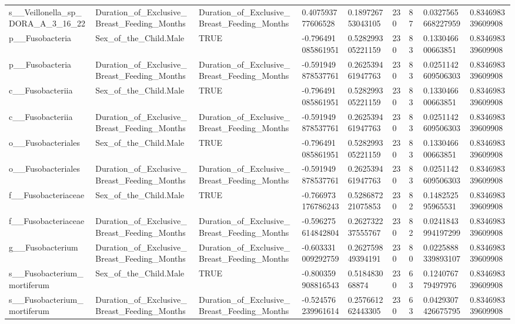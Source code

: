 \begin{longtable}{lllllllll}
s\_\_Veillonella\_sp\_DORA\_A\_3\_16\_22 & Duration\_of\_Exclusive\_Breast\_Feeding\_Months & Duration\_of\_Exclusive\_Breast\_Feeding\_Months & 0.407593777606528 & 0.189726753043105 & 230 & 87 & 0.0327565668227959 & 0.834698339609908 \\
p\_\_Fusobacteria & Sex\_of\_the\_Child.Male & TRUE & -0.796491085861951 & 0.528299305221159 & 230 & 83 & 0.133046600663851 & 0.834698339609908 \\
p\_\_Fusobacteria & Duration\_of\_Exclusive\_Breast\_Feeding\_Months & Duration\_of\_Exclusive\_Breast\_Feeding\_Months & -0.591949878537761 & 0.262539461947763 & 230 & 83 & 0.0251142609506303 & 0.834698339609908 \\
c\_\_Fusobacteriia & Sex\_of\_the\_Child.Male & TRUE & -0.796491085861951 & 0.528299305221159 & 230 & 83 & 0.133046600663851 & 0.834698339609908 \\
c\_\_Fusobacteriia & Duration\_of\_Exclusive\_Breast\_Feeding\_Months & Duration\_of\_Exclusive\_Breast\_Feeding\_Months & -0.591949878537761 & 0.262539461947763 & 230 & 83 & 0.0251142609506303 & 0.834698339609908 \\
o\_\_Fusobacteriales & Sex\_of\_the\_Child.Male & TRUE & -0.796491085861951 & 0.528299305221159 & 230 & 83 & 0.133046600663851 & 0.834698339609908 \\
o\_\_Fusobacteriales & Duration\_of\_Exclusive\_Breast\_Feeding\_Months & Duration\_of\_Exclusive\_Breast\_Feeding\_Months & -0.591949878537761 & 0.262539461947763 & 230 & 83 & 0.0251142609506303 & 0.834698339609908 \\
f\_\_Fusobacteriaceae & Sex\_of\_the\_Child.Male & TRUE & -0.766973176786243 & 0.528687221075853 & 230 & 82 & 0.148252595965531 & 0.834698339609908 \\
f\_\_Fusobacteriaceae & Duration\_of\_Exclusive\_Breast\_Feeding\_Months & Duration\_of\_Exclusive\_Breast\_Feeding\_Months & -0.596275614842804 & 0.262732237555767 & 230 & 82 & 0.0241843994197299 & 0.834698339609908 \\
g\_\_Fusobacterium & Duration\_of\_Exclusive\_Breast\_Feeding\_Months & Duration\_of\_Exclusive\_Breast\_Feeding\_Months & -0.603331009292759 & 0.262759849394191 & 230 & 80 & 0.0225888339893107 & 0.834698339609908 \\
s\_\_Fusobacterium\_mortiferum & Sex\_of\_the\_Child.Male & TRUE & -0.800359908816543 & 0.518483068874 & 230 & 63 & 0.124076779497976 & 0.834698339609908 \\
s\_\_Fusobacterium\_mortiferum & Duration\_of\_Exclusive\_Breast\_Feeding\_Months & Duration\_of\_Exclusive\_Breast\_Feeding\_Months & -0.524576239961614 & 0.257661262443305 & 230 & 63 & 0.0429307426675795 & 0.834698339609908 \\

\end{longtable}
